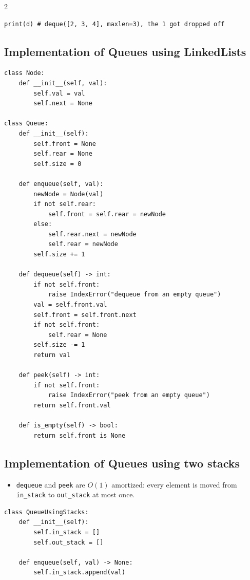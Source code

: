 \documentclass[9pt,a4paper]{extarticle}
\newlength{\tw}
\begin{document}
\begin{multicols}{2}
\begin{lstlisting}
print(d) # deque([2, 3, 4], maxlen=3), the 1 got dropped off
\end{lstlisting}

\subsection{Implementation of Queues using LinkedLists}

\begin{lstlisting}
class Node:
    def __init__(self, val):
        self.val = val
        self.next = None

class Queue:
    def __init__(self):
        self.front = None
        self.rear = None
        self.size = 0

    def enqueue(self, val):
        newNode = Node(val)
        if not self.rear:
            self.front = self.rear = newNode
        else:
            self.rear.next = newNode
            self.rear = newNode
        self.size += 1

    def dequeue(self) -> int:
        if not self.front:
            raise IndexError("dequeue from an empty queue")
        val = self.front.val
        self.front = self.front.next
        if not self.front:
            self.rear = None
        self.size -= 1
        return val

    def peek(self) -> int:
        if not self.front:
            raise IndexError("peek from an empty queue")
        return self.front.val

    def is_empty(self) -> bool:
        return self.front is None
\end{lstlisting}

\subsection{Implementation of Queues using two stacks}

\begin{itemize}
\item \texttt{dequeue} and \texttt{peek} are $O(1)$ amortized: every element is moved from \texttt{in\_\allowbreak{}stack} to \texttt{out\_\allowbreak{}stack} at most once.
\end{itemize}

\begin{lstlisting}
class QueueUsingStacks:
    def __init__(self):
        self.in_stack = []
        self.out_stack = []

    def enqueue(self, val) -> None:
        self.in_stack.append(val)


\end{lstlisting}
\end{multicols}
\end{document}

